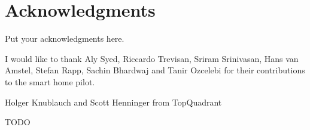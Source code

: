 \cleardoublepage




\bigskip

\begingroup
\let\clearpage\relax
\let\cleardoublepage\relax
\let\cleardoublepage\relax
\chapter*{Acknowledgments}
Put your acknowledgments here.

I would like to thank Aly Syed, Riccardo Trevisan, Sriram Srinivasan, Hans van Amstel, Stefan Rapp, Sachin Bhardwaj and Tanir Ozcelebi for their contributions to the smart home pilot.

Holger Knublauch and Scott Henninger from TopQuadrant

TODO


\endgroup



